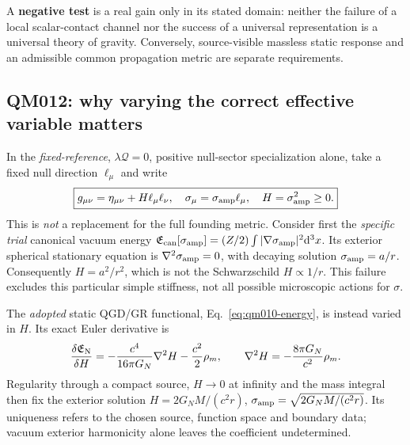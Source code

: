 \documentclass[11pt,a4paper]{article}
\begin{document}
A \textbf{negative test} is a real gain only in its stated domain: neither the failure of a local scalar-contact channel nor the success of a universal representation is a universal theory of gravity. Conversely, source-visible massless static response and an admissible common propagation metric are separate requirements.

\subsection{QM012: why varying the correct effective variable matters}\label{sec:v08-H-not-sigma}
In the \emph{fixed-reference}, $\lambda\mathcal Q=0$, positive null-sector specialization alone, take a fixed null direction $\ell_\mu$ and write
\begin{equation}\label{eq:v08-H-branch}
\boxed{g_{\mu\nu}=\eta_{\mu\nu}+H\ell_\mu\ell_\nu,\quad
\sigma_\mu=\sigma_{\rm amp}\ell_\mu,\quad
H=\sigma_{\rm amp}^2\geq0.}
\end{equation}
This is \emph{not} a replacement for the full founding metric. Consider first the \emph{specific trial} canonical vacuum energy $\mathfrak E_{\rm can}[\sigma_{\rm amp}]=(Z/2)\int |\nabla\sigma_{\rm amp}|^2\mathrm d^3x$. Its exterior spherical stationary equation is $\nabla^2\sigma_{\rm amp}=0$, with decaying solution $\sigma_{\rm amp}=a/r$. Consequently $H=a^2/r^2$, which is not the Schwarzschild $H\propto1/r$. This failure excludes this particular simple stiffness, not all possible microscopic actions for $\sigma$.

The \emph{adopted} static QGD/GR functional, Eq.~\eqref{eq:qm010-energy}, is instead varied in $H$. Its exact Euler derivative is
\begin{equation}\label{eq:v08-H-Euler}
\frac{\delta\mathfrak E_{\rm N}}{\delta H}=-\frac{c^4}{16\pi G_N}\nabla^2 H-\frac{c^2}{2}\rho_m,
\qquad \nabla^2H=-\frac{8\pi G_N}{c^2}\rho_m.
\end{equation}
Regularity through a compact source, $H\to0$ at infinity and the mass integral then fix the exterior solution $H=2G_NM/(c^2r)$, $\sigma_{\rm amp}=\sqrt{2G_NM/(c^2r)}$. Its uniqueness refers to the chosen source, function space and boundary data; vacuum exterior harmonicity alone leaves the coefficient undetermined.
\end{document}
